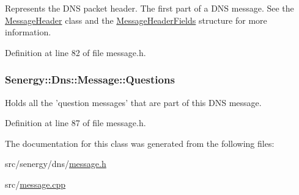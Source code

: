 Represents the D\-N\-S packet header. The first part of a D\-N\-S message. See the \hyperlink{class_senergy_1_1_dns_1_1_message_header}{Message\-Header} class and the \hyperlink{struct_senergy_1_1_dns_1_1_message_header_fields}{Message\-Header\-Fields} structure for more information. 



Definition at line 82 of file message.\-h.

\hypertarget{class_senergy_1_1_dns_1_1_message_a1e72009ea8004f0e8cc1ce0ea07f4ad1}{
\subsubsection[{Questions}]{ Senergy\-::\-Dns\-::\-Message\-::\-Questions}}\label{class_senergy_1_1_dns_1_1_message_a1e72009ea8004f0e8cc1ce0ea07f4ad1}


Holds all the 'question messages' that are part of this D\-N\-S message. 



Definition at line 87 of file message.\-h.



The documentation for this class was generated from the following files\-:\begin{DoxyCompactItemize}
\item 
src/senergy/dns/\hyperlink{message_8h}{message.\-h}\item 
src/\hyperlink{message_8cpp}{message.\-cpp}\end{DoxyCompactItemize}

